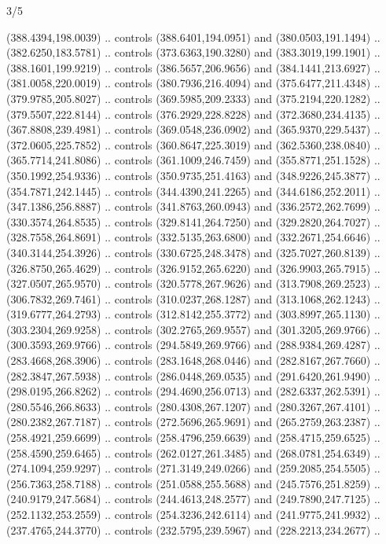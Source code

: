 \begin{flagdescription}{3/5}
\begin{scope}[shift={(0.5\flaglength,0.5\flagwidth)},scale=\flagwidth/510]
\begin{scope}[y=0.80pt, x=0.80pt, yscale=-1.06, xscale=1.06,yshift=-240pt,xshift=-400pt]
\begin{scope}[cm={{0.83333,0.0,0.0,0.83333,(154.64672,48.64761)}}]
  (388.4394,198.0039) .. controls (388.6401,194.0951) and (380.0503,191.1494) ..
  (382.6250,183.5781) .. controls (373.6363,190.3280) and (383.3019,199.1901) ..
  (388.1601,199.9219) .. controls (386.5657,206.9656) and (384.1441,213.6927) ..
  (381.0058,220.0019) .. controls (380.7936,216.4094) and (375.6477,211.4348) ..
  (379.9785,205.8027) .. controls (369.5985,209.2333) and (375.2194,220.1282) ..
  (379.5507,222.8144) .. controls (376.2929,228.8228) and (372.3680,234.4135) ..
  (367.8808,239.4981) .. controls (369.0548,236.0902) and (365.9370,229.5437) ..
  (372.0605,225.7852) .. controls (360.8647,225.3019) and (362.5360,238.0840) ..
  (365.7714,241.8086) .. controls (361.1009,246.7459) and (355.8771,251.1528) ..
  (350.1992,254.9336) .. controls (350.9735,251.4163) and (348.9226,245.3877) ..
  (354.7871,242.1445) .. controls (344.4390,241.2265) and (344.6186,252.2011) ..
  (347.1386,256.8887) .. controls (341.8763,260.0943) and (336.2572,262.7699) ..
  (330.3574,264.8535) .. controls (329.8141,264.7250) and (329.2820,264.7027) ..
  (328.7558,264.8691) .. controls (332.5135,263.6800) and (332.2671,254.6646) ..
  (340.3144,254.3926) .. controls (330.6725,248.3478) and (325.7027,260.8139) ..
  (326.8750,265.4629) .. controls (326.9152,265.6220) and (326.9903,265.7915) ..
  (327.0507,265.9570) .. controls (320.5778,267.9626) and (313.7908,269.2523) ..
  (306.7832,269.7461) .. controls (310.0237,268.1287) and (313.1068,262.1243) ..
  (319.6777,264.2793) .. controls (312.8142,255.3772) and (303.8997,265.1130) ..
  (303.2304,269.9258) .. controls (302.2765,269.9557) and (301.3205,269.9766) ..
  (300.3593,269.9766) .. controls (294.5849,269.9766) and (288.9384,269.4287) ..
  (283.4668,268.3906) .. controls (283.1648,268.0446) and (282.8167,267.7660) ..
  (282.3847,267.5938) .. controls (286.0448,269.0535) and (291.6420,261.9490) ..
  (298.0195,266.8262) .. controls (294.4690,256.0713) and (282.6337,262.5391) ..
  (280.5546,266.8633) .. controls (280.4308,267.1207) and (280.3267,267.4101) ..
  (280.2382,267.7187) .. controls (272.5696,265.9691) and (265.2759,263.2387) ..
  (258.4921,259.6699) .. controls (258.4796,259.6639) and (258.4715,259.6525) ..
  (258.4590,259.6465) .. controls (262.0127,261.3485) and (268.0781,254.6349) ..
  (274.1094,259.9297) .. controls (271.3149,249.0266) and (259.2085,254.5505) ..
  (256.7363,258.7188) .. controls (251.0588,255.5688) and (245.7576,251.8259) ..
  (240.9179,247.5684) .. controls (244.4613,248.2577) and (249.7890,247.7125) ..
  (252.1132,253.2559) .. controls (254.3236,242.6114) and (241.9775,241.9932) ..
  (237.4765,244.3770) .. controls (232.5795,239.5967) and (228.2213,234.2677) ..

\end{scope}
\end{scope}
\end{scope}
\end{flagdescription}
